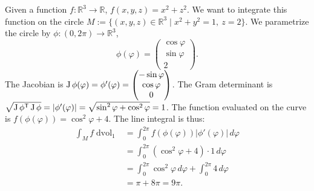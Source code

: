 \begin{example}
\label{ex:line_integral_function_circle}
Given a function $f: \mathbb{R}^3 \to \mathbb{R}$, $f(x,y,z) = x^2+z^2$. We want to integrate this function on the circle $M := \{(x,y,z) \in \mathbb{R}^3 \mid x^2+y^2=1,\ z=2\}$.
We parametrize the circle by $\phi: (0,2\pi) \to \mathbb{R}^3$,
\[\phi(\varphi) = \begin{pmatrix} \cos\varphi \\ \sin\varphi \\ 2 \end{pmatrix}.\]
The Jacobian is $\operatorname{J}\phi(\varphi) = \phi'(\varphi) = \begin{pmatrix} -\sin\varphi \\ \cos\varphi \\ 0 \end{pmatrix}$.
The Gram determinant is $\sqrt{\operatorname{J}\phi^{\mathsf{T}} \operatorname{J}\phi} = |\phi'(\varphi)| = \sqrt{\sin^2\varphi + \cos^2\varphi} = 1$.
The function evaluated on the curve is $f(\phi(\varphi)) = \cos^2\varphi + 4$.
The line integral is thus:
\begin{align*}
\int_M f \mathop{d\text{vol}}_1 &= \int_0^{2\pi} f(\phi(\varphi)) |\phi'(\varphi)| \,d\varphi \\
&= \int_0^{2\pi} (\cos^2\varphi + 4) \cdot 1 \,d\varphi \\
&= \int_0^{2\pi} \cos^2\varphi \,d\varphi + \int_0^{2\pi} 4 \,d\varphi \\
&= \pi + 8\pi = 9\pi.
\end{align*}
\end{example}





